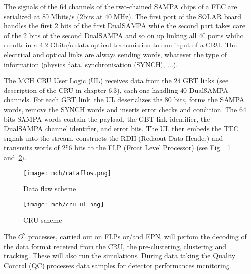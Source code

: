  The signals of the 64 channels of
the two-chained SAMPA chips of a FEC are serialized at 80
Mbits/s (2bits at 40 MHz). The first port of the SOLAR board handles
the first 2 bits of the first DualSAMPA while the second port takes care of the 2 bits of
the second DualSAMPA and so on up linking all 40 ports whihc results in a 4.2
Gbits/s data optical transmission to one input of a CRU. The
electrical and optical links are always sending words, whatever the
type of information (physics data, synchronisation (SYNCH), ...). 

The MCH CRU User Logic (UL) receives data from the 24 GBT links (see description of the CRU in
chapter 6.3), each one handling 40 DualSAMPA channels. For each GBT
link, the UL deserializes the 80 bits, forms the SAMPA
words, remove the SYNCH words and inserts error checks and
condition. The 64 bits SAMPA words contain the payload, the GBT
link identifier, the DualSAMPA channel identifier, and error bits. The
UL then embeds the TTC signals into the stream, constructs
the RDH (Redaout Data Header) and transmits words of 256 bits to the FLP (Front Level
Processor) (see Fig. ~\ref{dataflow} and~\ref{cru-ul}).

\begin{figure}[h]
  \centering
  \texttt{[image: mch/dataflow.png]}
     \caption[Data flow]{Data flow scheme}
  \label{dataflow}
\end{figure}

\begin{figure}[h]
  \centering
  \texttt{[image: mch/cru-ul.png]}
     \caption[CRU Scheme]{CRU scheme}
  \label{cru-ul}
\end{figure}

The $O^2$ processes, carried out on FLPs or/and EPN,  will perfom the decoding of the data
format received from the CRU, the pre-clustering, clustering and tracking. These
will also run the simulations.
During data taking the Quality Control (QC) processes data samples for detector performances
monitoring.


